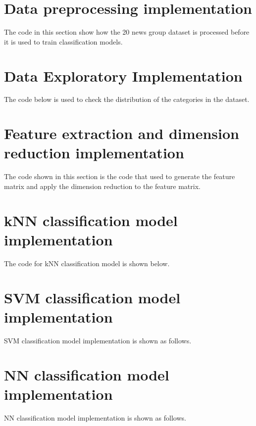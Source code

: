 \chapter{Data preprocessing implementation}
The code in this section show how the 20 news group dataset is processed before it is used to train classification models.\\



\chapter{Data Exploratory Implementation}
The code below is used to check the distribution of the categories in the dataset.\\



\chapter{Feature extraction and dimension reduction implementation}
The code shown in this section is the code that used to generate the feature matrix and apply the dimension reduction to the feature matrix.\\



\chapter{kNN classification model implementation}
The code for kNN classification model is shown below.\\



\chapter{SVM classification model implementation}
SVM classification model implementation is shown as follows.\\



\chapter{NN classification model implementation}
NN classification model implementation is shown as follows.\\


